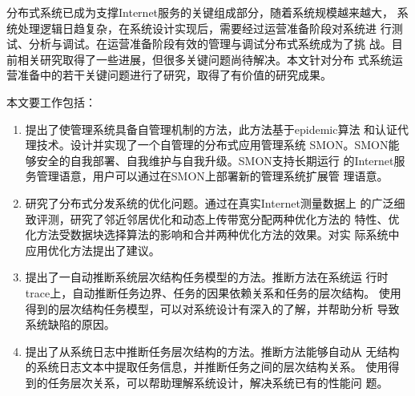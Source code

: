 \begin{cabstract}


  分布式系统已成为支撑Internet服务的关键组成部分，随着系统规模越来越大，
  系统处理逻辑日趋复杂，在系统设计实现后，需要经过运营准备阶段对系统进
  行测试、分析与调试。在运营准备阶段有效的管理与调试分布式系统成为了挑
  战。目前相关研究取得了一些进展，但很多关键问题尚待解决。本文针对分布
  式系统运营准备中的若干关键问题进行了研究，取得了有价值的研究成果。

  本文要工作包括：

  \begin{enumerate}

    \item 提出了使管理系统具备自管理机制的方法，此方法基于epidemic算法
    和认证代理技术。设计并实现了一个自管理的分布式应用管理系统
    SMON。SMON能够安全的自我部署、自我维护与自我升级。SMON支持长期运行
    的Internet服务管理语意，用户可以通过在SMON上部署新的管理系统扩展管
    理语意。

    \item 研究了分布式分发系统的优化问题。通过在真实Internet测量数据上
    的广泛细致评测，研究了邻近邻居优化和动态上传带宽分配两种优化方法的
    特性、优化方法受数据块选择算法的影响和合并两种优化方法的效果。对实
    际系统中应用优化方法提出了建议。

    \item 提出了一自动推断系统层次结构任务模型的方法。推断方法在系统运
    行时trace上，自动推断任务边界、任务的因果依赖关系和任务的层次结构。
    使用得到的层次结构任务模型，可以对系统设计有深入的了解，并帮助分析
    导致系统缺陷的原因。

    \item 提出了从系统日志中推断任务层次结构的方法。推断方法能够自动从
    无结构的系统日志文本中提取任务信息，并推断任务之间的层次结构关系。
    使用得到的任务层次关系，可以帮助理解系统设计，解决系统已有的性能问
    题。

  \end{enumerate}

\end{cabstract}


